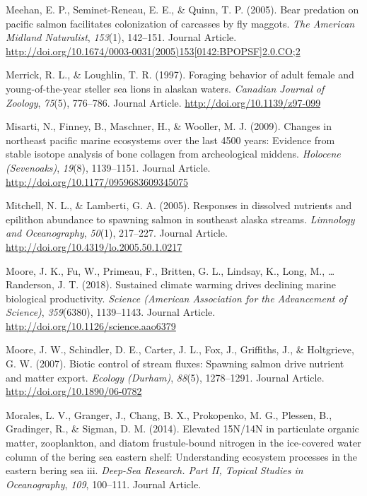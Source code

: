 \documentclass [11pt, proquest] {uwthesis}[2015/03/03]
\begin{document}
\hypertarget{ref-Meehan2005}{}
Meehan, E. P., Seminet-Reneau, E. E., \& Quinn, T. P. (2005). Bear
predation on pacific salmon facilitates colonization of carcasses by fly
maggots. \emph{The American Midland Naturalist}, \emph{153}(1),
142--151. Journal Article.
\href{http://doi.org/10.1674/0003-0031(2005)153\%5B0142:BPOPSF\%5D2.0.CO;2}{http://doi.org/10.1674/0003-0031(2005)153{[}0142:BPOPSF{]}2.0.CO;2}

\hypertarget{ref-Merrick1997}{}
Merrick, R. L., \& Loughlin, T. R. (1997). Foraging behavior of adult
female and young-of-the-year steller sea lions in alaskan waters.
\emph{Canadian Journal of Zoology}, \emph{75}(5), 776--786. Journal
Article. \url{http://doi.org/10.1139/z97-099}

\hypertarget{ref-Misarti2009}{}
Misarti, N., Finney, B., Maschner, H., \& Wooller, M. J. (2009). Changes
in northeast pacific marine ecosystems over the last 4500 years:
Evidence from stable isotope analysis of bone collagen from
archeological middens. \emph{Holocene (Sevenoaks)}, \emph{19}(8),
1139--1151. Journal Article.
\url{http://doi.org/10.1177/0959683609345075}

\hypertarget{ref-Mitchell2005}{}
Mitchell, N. L., \& Lamberti, G. A. (2005). Responses in dissolved
nutrients and epilithon abundance to spawning salmon in southeast alaska
streams. \emph{Limnology and Oceanography}, \emph{50}(1), 217--227.
Journal Article. \url{http://doi.org/10.4319/lo.2005.50.1.0217}

\hypertarget{ref-Moore2018}{}
Moore, J. K., Fu, W., Primeau, F., Britten, G. L., Lindsay, K., Long,
M., \ldots{} Randerson, J. T. (2018). Sustained climate warming drives
declining marine biological productivity. \emph{Science (American
Association for the Advancement of Science)}, \emph{359}(6380),
1139--1143. Journal Article.
\url{http://doi.org/10.1126/science.aao6379}

\hypertarget{ref-Moore2007}{}
Moore, J. W., Schindler, D. E., Carter, J. L., Fox, J., Griffiths, J.,
\& Holtgrieve, G. W. (2007). Biotic control of stream fluxes: Spawning
salmon drive nutrient and matter export. \emph{Ecology (Durham)},
\emph{88}(5), 1278--1291. Journal Article.
\url{http://doi.org/10.1890/06-0782}

\hypertarget{ref-Morales2014}{}
Morales, L. V., Granger, J., Chang, B. X., Prokopenko, M. G., Plessen,
B., Gradinger, R., \& Sigman, D. M. (2014). Elevated 15N/14N in
particulate organic matter, zooplankton, and diatom frustule-bound
nitrogen in the ice-covered water column of the bering sea eastern
shelf: Understanding ecosystem processes in the eastern bering sea iii.
\emph{Deep-Sea Research. Part II, Topical Studies in Oceanography},
\emph{109}, 100--111. Journal Article.
\end{document}
